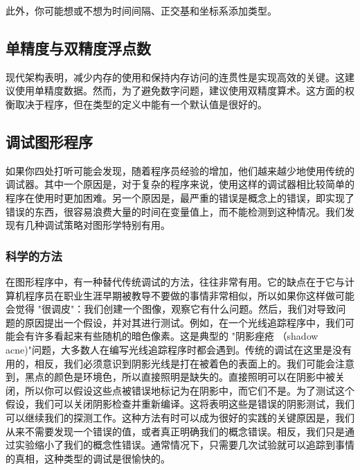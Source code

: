 \documentclass[lang=cn,10pt]{elegantbook}
\begin{document}
此外，你可能想或不想为时间间隔、正交基和坐标系添加类型。


\subsection{单精度与双精度浮点数}

现代架构表明，减少内存的使用和保持内存访问的连贯性是实现高效的关键。这建议使用单精度数据。然而，为了避免数字问题，建议使用双精度算术。这方面的权衡取决于程序，但在类型的定义中能有一个默认值是很好的。


\subsection{调试图形程序}

如果你四处打听可能会发现，随着程序员经验的增加，他们越来越少地使用传统的调试器。其中一个原因是，对于复杂的程序来说，使用这样的调试器相比较简单的程序在使用时更加困难。另一个原因是，最严重的错误是概念上的错误，即实现了错误的东西，很容易浪费大量的时间在变量值上，而不能检测到这种情况。我们发现有几种调试策略对图形学特别有用。


\subsubsection{科学的方法}

在图形程序中，有一种替代传统调试的方法，往往非常有用。它的缺点在于它与计算机程序员在职业生涯早期被教导不要做的事情非常相似，所以如果你这样做可能会觉得 "很调皮"：我们创建一个图像，观察它有什么问题。然后，我们对导致问题的原因提出一个假设，并对其进行测试。例如，在一个光线追踪程序中，我们可能会有许多看起来有些随机的暗色像素。这是典型的 "阴影痤疮 （shadow acne)"问题，大多数人在编写光线追踪程序时都会遇到。传统的调试在这里是没有用的，相反，我们必须意识到阴影光线是打在被着色的表面上的。我们可能会注意到，黑点的颜色是环境色，所以直接照明是缺失的。直接照明可以在阴影中被关闭，所以你可以假设这些点被错误地标记为在阴影中，而它们不是。为了测试这个假设，我们可以关闭阴影检查并重新编译。这将表明这些是错误的阴影测试，我们可以继续我们的探测工作。这种方法有时可以成为很好的实践的关键原因是，我们从来不需要发现一个错误的值，或者真正明确我们的概念错误。相反，我们只是通过实验缩小了我们的概念性错误。通常情况下，只需要几次试验就可以追踪到事情的真相，这种类型的调试是很愉快的。
\end{document}
